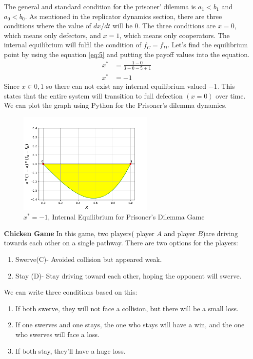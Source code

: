 \documentclass{article}
\begin{document}
The general and standard condition for the prisoner' dilemma is $a_1<b_1$ and $a_0<b_0$. As mentioned in the replicator dynamics section, there are three conditions where the value of $dx/dt$ will be $0$. The three conditions are $x=0$, which means only defectors, and $x=1$, which means only cooperators. The internal equilibrium will fulfil the condition of $f_C=f_D$. Let's find the equilibrium point by using the equation \eqref{eq:5} and putting the payoff values into the equation.
\begin{align}
x^*&=\frac{1-0}{3-0-5 +1} \nonumber\\
x^*&= -1 \nonumber
\end{align}
Since $x\in{0,1}$ so there can not exist any internal equilibrium valued $-1$. This states that the entire system will transition to full defection $(x=0)$ over time.
We can plot the graph using Python for the Prisoner's dilemma dynamics.
\begin{figure}[H]
    \centering
    \includegraphics[width=0.6\textwidth]{PD.pdf}
    \caption{$x^*=-1$, Internal Equilibrium for Prisoner's Dilemma Game}
    \label{fig:1}
\end{figure}
\textbf{Chicken Game}
\newline
In this game, two players( player $A$ and player $B$)are driving towards each other on a single pathway. There are two options for the players:
\begin{enumerate}
\item Swerve(C)- Avoided collision but appeared weak.
\item Stay (D)- Stay driving toward each other, hoping the opponent will swerve.
\end{enumerate}
We can write three conditions based on this:
\begin{enumerate}
\item If both swerve, they will not face a collision, but there will be a small loss.
\item If one swerves and one stays, the one who stays will have a win, and the one who swerves will face a loss.
\item If both stay, they'll have a huge loss.
\end{enumerate}
\end{document}
